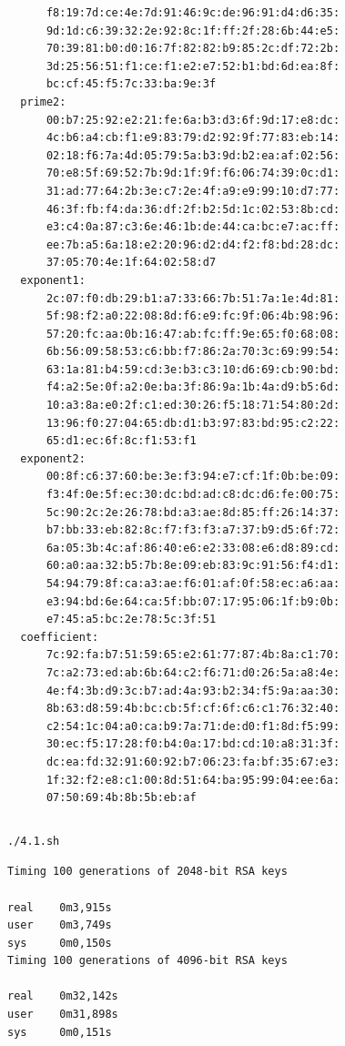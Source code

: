 \documentclass{kpi-lab}
\begin{document}
\begin{verbatim}
      f8:19:7d:ce:4e:7d:91:46:9c:de:96:91:d4:d6:35:
      9d:1d:c6:39:32:2e:92:8c:1f:ff:2f:28:6b:44:e5:
      70:39:81:b0:d0:16:7f:82:82:b9:85:2c:df:72:2b:
      3d:25:56:51:f1:ce:f1:e2:e7:52:b1:bd:6d:ea:8f:
      bc:cf:45:f5:7c:33:ba:9e:3f
  prime2:
      00:b7:25:92:e2:21:fe:6a:b3:d3:6f:9d:17:e8:dc:
      4c:b6:a4:cb:f1:e9:83:79:d2:92:9f:77:83:eb:14:
      02:18:f6:7a:4d:05:79:5a:b3:9d:b2:ea:af:02:56:
      70:e8:5f:69:52:7b:9d:1f:9f:f6:06:74:39:0c:d1:
      31:ad:77:64:2b:3e:c7:2e:4f:a9:e9:99:10:d7:77:
      46:3f:fb:f4:da:36:df:2f:b2:5d:1c:02:53:8b:cd:
      e3:c4:0a:87:c3:6e:46:1b:de:44:ca:bc:e7:ac:ff:
      ee:7b:a5:6a:18:e2:20:96:d2:d4:f2:f8:bd:28:dc:
      37:05:70:4e:1f:64:02:58:d7
  exponent1:
      2c:07:f0:db:29:b1:a7:33:66:7b:51:7a:1e:4d:81:
      5f:98:f2:a0:22:08:8d:f6:e9:fc:9f:06:4b:98:96:
      57:20:fc:aa:0b:16:47:ab:fc:ff:9e:65:f0:68:08:
      6b:56:09:58:53:c6:bb:f7:86:2a:70:3c:69:99:54:
      63:1a:81:b4:59:cd:3e:b3:c3:10:d6:69:cb:90:bd:
      f4:a2:5e:0f:a2:0e:ba:3f:86:9a:1b:4a:d9:b5:6d:
      10:a3:8a:e0:2f:c1:ed:30:26:f5:18:71:54:80:2d:
      13:96:f0:27:04:65:db:d1:b3:97:83:bd:95:c2:22:
      65:d1:ec:6f:8c:f1:53:f1
  exponent2:
      00:8f:c6:37:60:be:3e:f3:94:e7:cf:1f:0b:be:09:
      f3:4f:0e:5f:ec:30:dc:bd:ad:c8:dc:d6:fe:00:75:
      5c:90:2c:2e:26:78:bd:a3:ae:8d:85:ff:26:14:37:
      b7:bb:33:eb:82:8c:f7:f3:f3:a7:37:b9:d5:6f:72:
      6a:05:3b:4c:af:86:40:e6:e2:33:08:e6:d8:89:cd:
      60:a0:aa:32:b5:7b:8e:09:eb:83:9c:91:56:f4:d1:
      54:94:79:8f:ca:a3:ae:f6:01:af:0f:58:ec:a6:aa:
      e3:94:bd:6e:64:ca:5f:bb:07:17:95:06:1f:b9:0b:
      e7:45:a5:bc:2e:78:5c:3f:51
  coefficient:
      7c:92:fa:b7:51:59:65:e2:61:77:87:4b:8a:c1:70:
      7c:a2:73:ed:ab:6b:64:c2:f6:71:d0:26:5a:a8:4e:
      4e:f4:3b:d9:3c:b7:ad:4a:93:b2:34:f5:9a:aa:30:
      8b:63:d8:59:4b:bc:cb:5f:cf:6f:c6:c1:76:32:40:
      c2:54:1c:04:a0:ca:b9:7a:71:de:d0:f1:8d:f5:99:
      30:ec:f5:17:28:f0:b4:0a:17:bd:cd:10:a8:31:3f:
      dc:ea:fd:32:91:60:92:b7:06:23:fa:bf:35:67:e3:
      1f:32:f2:e8:c1:00:8d:51:64:ba:95:99:04:ee:6a:
      07:50:69:4b:8b:5b:eb:af
\end{verbatim}

\inputminted{bash}{4.1.sh}
\begin{verbatim}
./4.1.sh
\end{verbatim}
\begin{verbatim}
Timing 100 generations of 2048-bit RSA keys

real    0m3,915s
user    0m3,749s
sys     0m0,150s
Timing 100 generations of 4096-bit RSA keys

real    0m32,142s
user    0m31,898s
sys     0m0,151s
\end{verbatim}
\end{document}
